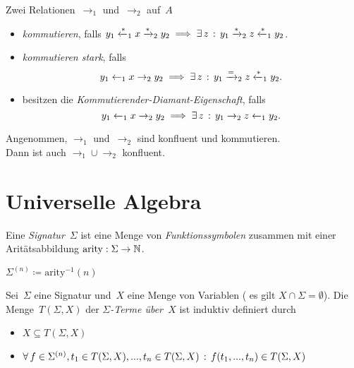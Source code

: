 \documentclass{cheat-sheet}
\newcommand{\from}{\leftarrow}
\newcommand{\reducesTo}{\xrightarrow{*}}
\newcommand{\reducesFrom}{\xleftarrow{*}}
\newcommand{\toOrEq}{\xrightarrow{=}}
\begin{document}
\begin{defn}
  Zwei Relationen~${\to_1}$ und~${\to_2}$ auf~$A$
  \begin{itemize}
    \item \emph{kommutieren}, falls $y_1 \reducesFrom_1 x \reducesTo_2 y_2 \implies \ex{z} y_1 \reducesTo_2 z \reducesFrom_1 y_2$.
    \item \emph{kommutieren stark}, falls
    \[
      y_1 \from_1 x \to_2 y_2 \implies \ex{z} y_1 \toOrEq_2 z \reducesFrom_1 y_2.
    \]
    \item besitzen die \emph{Kommutierender-Diamant-Eigenschaft}, falls
    \[
      y_1 \from_1 x \to_2 y_2 \implies \ex{z} y_1 \to_2 z \from_1 y_2.
    \]
  \end{itemize}
\end{defn}

\begin{lem}
  Angenommen, $\to_1$ und~$\to_2$ sind konfluent und kommutieren. \\
  Dann ist auch ${\to_1} \cup {\to_2}$ konfluent.
\end{lem}

\section{Universelle Algebra}


\begin{defn}
  Eine \emph{Signatur}~$\Sigma$ ist eine Menge von \textit{Funktionssymbolen} zusammen mit einer Aritätsabbildung $\mathrm{arity} : \Sigma \to \mathbb{N}$.
\end{defn}

\begin{nota}
  $\Sigma^{(n)} \coloneqq \mathrm{arity}^{-1}(n)$
\end{nota}

\begin{defn}
  Sei~$\Sigma$ eine Signatur und~$X$ eine Menge von Variablen (\dh{} es gilt $X \cap \Sigma = \emptyset$).
  Die Menge~$T(\Sigma, X)$ der \emph{$\Sigma$-Terme über~$X$} ist induktiv definiert durch
  \begin{itemize}
    \item $X \subseteq T(\Sigma, X)$
    \item $\forall \, {f \in \Sigma^{(n)}, t_1 \in T(\Sigma, X), ..., t_n \in T(\Sigma, X)} \,:\, f(t_1, ..., t_n) \in T(\Sigma, X)$
  \end{itemize}
\end{defn}
\end{document}
